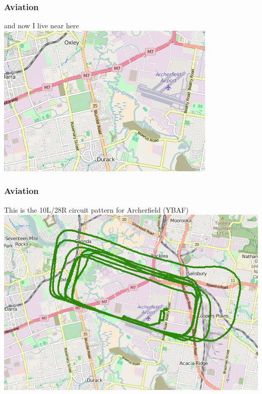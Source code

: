 \begin{frame}
\frametitle{Aviation}
\begin{block}{and now I live near here}
\includegraphics[height=0.5\textheight]{image/archerfield-map.png}
\end{block}
\end{frame}

\begin{frame}
\frametitle{Aviation}
\begin{block}{This is the 10L/28R circuit pattern for Archerfield (YBAF)}
\includegraphics[height=0.5\textheight]{image/archerfield-circuit.png}
\end{block}
\end{frame}

